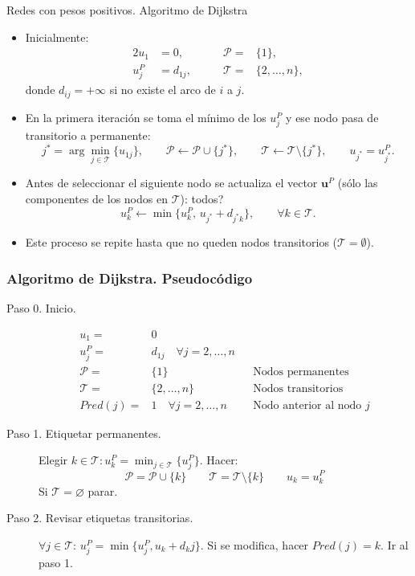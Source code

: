 \documentclass[aspectratio=169]{beamer}
\newcommand{\fli}{\leftarrow}
\newcommand{\V}[1]{\mathbf{#1}}
\newcommand{\PP}{\mathcal{P}}
\newcommand{\T}{\mathcal{T}}
\newcommand{\vu}{\V{u}}
\begin{document}

\begin{frame}{Redes con pesos positivos. Algoritmo de Dijkstra}
	\begin{itemize}
		\item 	Inicialmente:
		\begin{alignat*}{2}
			u_1 & =0, &\qquad \PP=&\{1\},\\[2mm]
			u_j^P & =d_{1j}, &\qquad \T=&\{2,\dots,n\},
		\end{alignat*}
		donde $d_{ij}=+\infty$ si no existe el arco de $i$ a $j$.
		\item En la primera iteraci\'on se toma el m\'inimo de los $u_j^P$ y ese nodo pasa de transitorio a permanente:
		$$
		j^*=\arg\min_{j\in\T}\{u_{1j}\},\quad\quad\PP\fli\PP\cup\{j^*\},\quad\quad\T\fli
		\T\setminus\{j^*\}, \quad\quad u_{j^*}=u_{j^*}^P .
		$$
		\item Antes de seleccionar el siguiente nodo se actualiza el vector $\vu^P$ (s\'olo las componentes de los nodos en $\T$): \alert{todos?}
		$$
		u_k^P\fli \min\bigl\{u_k^P,\, u_{j^*}+d_{j^*k}\bigr\},\qquad\forall k\in\T.
		$$
		\item Este proceso se repite hasta que no queden nodos transitorios ($\T=\emptyset$).
	\end{itemize}
\end{frame}

\begin{frame}
	
	\frametitle{Algoritmo de Dijkstra. Pseudoc\'odigo}
	
	\begin{description}
		\item[Paso 0. Inicio.]
			\begin{align*}
			u_1 = & 0 \\
			u_j^P = & d_{1j} \quad \forall j=2,\ldots,n \\
			\PP = & \{1\} && \textrm{Nodos permanentes} \\
			\T = & \{2,\ldots,n\} && \textrm{Nodos transitorios} \\
			Pred(j) = & 1 \quad \forall j=2,\ldots,n && \textrm{Nodo anterior al nodo }j
		\end{align*}
		\item[Paso 1. Etiquetar permanentes.] Elegir $k\in \T: u_k^P =\min_{j \in \T}\{u_j^P\}$. Hacer:
			$$\PP=\PP\cup\{k\}\qquad \T=\T\setminus\{k\} \qquad u_{k}=u_{k}^P$$
		Si $\T=\varnothing$ parar.
		\item[Paso 2. Revisar etiquetas transitorias.] $\forall j \in\T$: $u_j^P=\min\{u_j^P,u_k+d_kj\}$. Si se modifica, hacer $Pred(j)=k$. Ir al paso 1.
	\end{description}
	
\end{frame}
\end{document}
